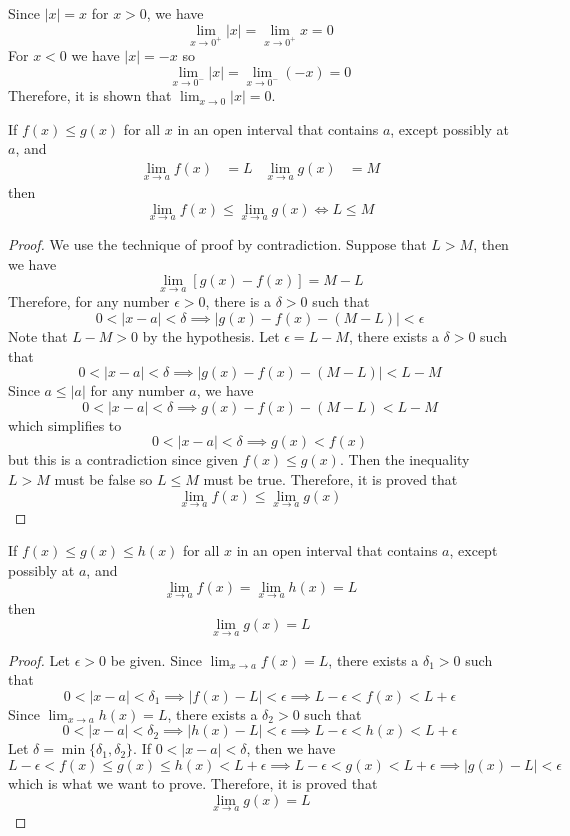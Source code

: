 \begin{solution}
    Since \(|x|=x\) for \(x>0\), we have
    \[\lim_{x\to 0^+}|x|=\lim_{x\to 0^+}x=0\]
    For \(x<0\) we have \(|x|=-x\) so
    \[\lim_{x\to 0^-}|x|=\lim_{x\to 0^-}(-x)=0\]
    Therefore, it is shown that \(\lim_{x\to 0}|x|=0\).
\end{solution}
\begin{theorem}
    If \(f(x)\leq g(x)\) for all \(x\) in an open interval that contains
    \(a\), except possibly at \(a\), and
    \begin{align*}
        \lim_{x\to a}f(x) &= L & \lim_{x\to a}g(x) &= M
    \end{align*}
    then
    \[\lim_{x\to a}f(x)\leq\lim_{x\to a}g(x)\iff L\leq M\]
\end{theorem}
\begin{proof}
    We use the technique of proof by contradiction.
    Suppose  that \(L>M\), then we have
    \[\lim_{x\to a}[g(x)-f(x)]=M-L\]
    Therefore, for any number \(\epsilon>0\),
    there is a \(\delta>0\) such that
    \[0<|x-a|<\delta\implies|g(x)-f(x)-(M-L)|<\epsilon\]
    Note that \(L-M>0\) by the hypothesis.
    Let \(\epsilon=L-M\), there exists a \(\delta>0\) such that
    \[0<|x-a|<\delta\implies|g(x)-f(x)-(M-L)|<L-M\]
    Since \(a\leq|a|\) for any number \(a\), we have
    \[0<|x-a|<\delta\implies g(x)-f(x)-(M-L)<L-M\]
    which simplifies to
    \[0<|x-a|<\delta\implies g(x)<f(x)\]
    but this is a contradiction since given \(f(x)\leq g(x)\).
    Then the inequality \(L>M\) must be false so \(L\leq M\) must be true.
    Therefore, it is proved that
    \[\lim_{x\to a}f(x)\leq\lim_{x\to a}g(x)\]
\end{proof}
\begin{theorem}
    If \(f(x)\leq g(x)\leq h(x)\) for all \(x\) in an open interval that
    contains \(a\), except possibly at \(a\), and
    \[\lim_{x\to a}f(x)=\lim_{x\to a}h(x)=L\]
    then
    \[\lim_{x\to a}g(x)=L\]
\end{theorem}
\begin{proof}
    Let \(\epsilon>0\) be given. Since \(\lim_{x\to a}f(x)=L\), there exists a
    \(\delta_1>0\) such that
    \[0<|x-a|<\delta_1\implies|f(x)-L|<\epsilon\implies L-\epsilon<f(x)
    <L+\epsilon\]
    Since \(\lim_{x\to a}h(x)=L\), there exists a \(\delta_2>0\) such that
    \[0<|x-a|<\delta_2\implies|h(x)-L|<\epsilon\implies L-\epsilon<h(x)
    <L+\epsilon\]
    Let \(\delta=\min\{\delta_1,\delta_2\}\).
    If \(0<|x-a|<\delta\), then we have
    \[L-\epsilon<f(x)\leq g(x)\leq h(x)<L+\epsilon\implies L-\epsilon<g(x)
    <L+\epsilon\implies|g(x)-L|<\epsilon\]
    which is what we want to prove.
    Therefore, it is proved that \[\lim_{x\to a}g(x)=L\]
\end{proof}
